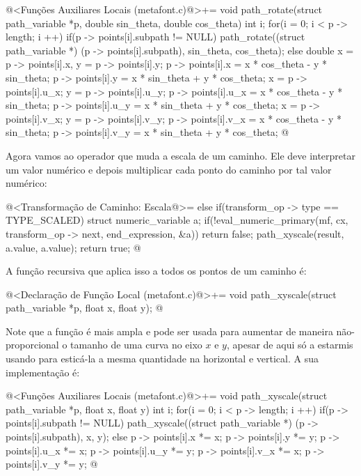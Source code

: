 {\iniciocodigo
@<Funções Auxiliares Locais (metafont.c)@>+=
void path_rotate(struct path_variable *p, double sin_theta,
                 double cos_theta){
  int i;
  for(i = 0; i < p -> length; i ++){
    if(p -> points[i].subpath != NULL)
      path_rotate((struct path_variable *) (p -> points[i].subpath),
                  sin_theta, cos_theta);
    else{
      double x = p -> points[i].x, y = p -> points[i].y;
      p -> points[i].x = x * cos_theta - y * sin_theta;
      p -> points[i].y = x * sin_theta + y * cos_theta;
      x = p -> points[i].u_x;
      y = p -> points[i].u_y;
      p -> points[i].u_x = x * cos_theta - y * sin_theta;
      p -> points[i].u_y = x * sin_theta + y * cos_theta;
      x = p -> points[i].v_x;
      y = p -> points[i].v_y;
      p -> points[i].v_x = x * cos_theta - y * sin_theta;
      p -> points[i].v_y = x * sin_theta + y * cos_theta;
    }
  }
}
@
\fimcodigo

Agora vamos ao operador que muda a escala de um caminho. Ele deve
interpretar um valor numérico e depois multiplicar cada ponto do
caminho por tal valor numérico:

@<Transformação de Caminho: Escala@>=
else if(transform_op -> type == TYPE_SCALED){
  struct numeric_variable a;
  if(!eval_numeric_primary(mf, cx, transform_op -> next, end_expression,
                          &a))
    return false;
  path_xyscale(result, a.value, a.value);  
  return true;
}
@
\fimcodigo

A função recursiva que aplica isso a todos os pontos de um caminho é:

\iniciocodigo
@<Declaração de Função Local (metafont.c)@>+=
void path_xyscale(struct path_variable *p, float x, float y);
@
\fimcodigo

Note que a função é mais ampla e pode ser usada para aumentar de
maneira não-proporcional o tamanho de uma curva no eixo $x$ e $y$,
apesar de aqui só a estarmis usando para esticá-la a mesma quantidade
na horizontal e vertical. A sua implementação é:

\iniciocodigo
@<Funções Auxiliares Locais (metafont.c)@>+=
void path_xyscale(struct path_variable *p, float x, float y){
  int i;
  for(i = 0; i < p -> length; i ++){
    if(p -> points[i].subpath != NULL)
      path_xyscale((struct path_variable *) (p -> points[i].subpath), x,
                   y);
    else{
      p -> points[i].x *= x;
      p -> points[i].y *= y;
      p -> points[i].u_x *= x;
      p -> points[i].u_y *= y;
      p -> points[i].v_x *= x;
      p -> points[i].v_y *= y;
    }
  }
}
@
\fimcodigo

}
